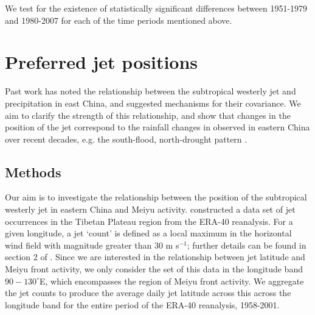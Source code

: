 \documentclass[draft,grl]{AGUTeX}
\begin{document}
\begin{article}
	
	We test for the existence of statistically significant differences between 1951-1979 and 1980-2007 for each of the time periods mentioned above.
	
\section{Preferred jet positions}
Past work has noted the relationship between the subtropical westerly jet and precipitation in east China, and suggested mechanisms for their covariance\citep{Molnar2010, Sampe2010, Chen2014}. We aim to clarify the strength of this relationship, and show that changes in the position of the jet correspond to the rainfall changes in observed in eastern China over recent decades, e.g. the south-flood, north-drought pattern \citep{Nigam2013}. 

\subsection{Methods} 

Our aim is to investigate the relationship between the position of the subtropical westerly jet in eastern China and Meiyu activity. \citep{Schiemann2009} constructed a data set of jet occurrences in the Tibetan Plateau region from the ERA-40 reanalysis.  For a given longitude, a jet `count'  is defined as a local maximum in the horizontal wind field with magnitude greater than $30$ m s$^{-1}$; further details can be found in section 2 of \citep{Schiemann2009}. Since we are interested in the relationship between jet latitude and Meiyu front activity, we only consider the set of this data in the longitude band $90-130^\circ$E, which encompasses the region of Meiyu front activity. We aggregate the jet counts to produce the average daily jet latitude across this across the longitude band for the entire period of the ERA-40 reanalysis, 1958-2001. 


\end{article}
\end{document}
